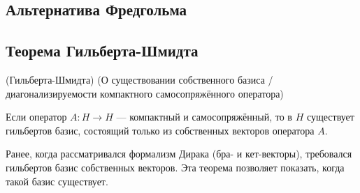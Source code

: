 \documentclass[12pt]{article}
\begin{document}
	\subsection{Альтернатива Фредгольма}
	
	\subsection{Теорема Гильберта-Шмидта}
	\begin{theorem}
		(Гильберта-Шмидта) (О существовании {\color{gray}собственного} базиса
		/диагонализируемости компактного самосопряжённого оператора)
		
		Если оператор $A : H \rightarrow H$ --- компактный и самосопряжённый, то в $H$ существует гильбертов 
		базис, состоящий только из собственных векторов оператора $A$.
	\end{theorem}
	Ранее, когда рассматривался формализм Дирака (бра- и кет-векторы), требовался гильбертов базис собственных
	векторов. Эта теорема позволяет показать, когда такой базис существует.
\end{document}
